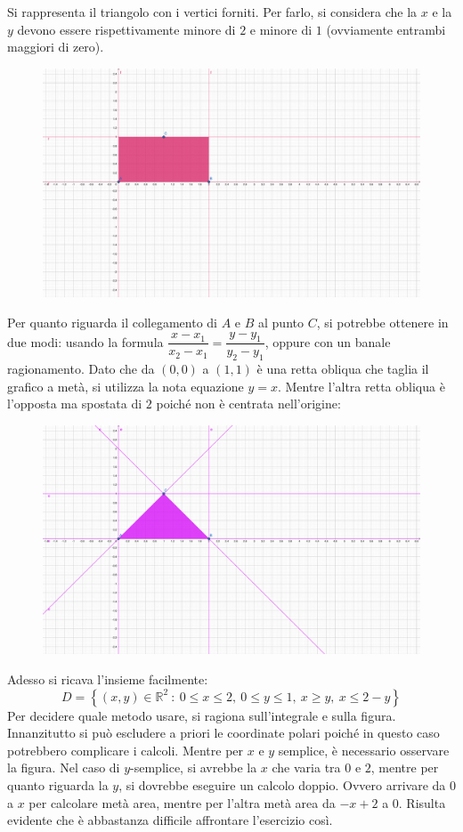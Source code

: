 \documentclass[a4paper]{article}
\begin{document}
	\noindent
	Si rappresenta il triangolo con i vertici forniti. Per farlo, si considera che la $x$ e la $y$ devono essere rispettivamente minore di $2$ e minore di $1$ (ovviamente entrambi maggiori di zero). 
	\begin{figure}[!htp]
		\centering
		\includegraphics[width=.8\textwidth]{img/exercise/2023-07-10-A-ex6.pdf}
	\end{figure}
	
	\noindent
	Per quanto riguarda il collegamento di $A$ e $B$ al punto $C$, si potrebbe ottenere in due modi: usando la formula $\dfrac{x-x_{1}}{x_{2}-x_{1}} = \dfrac{y-y_{1}}{y_{2}-y_{1}}$, oppure con un banale ragionamento. Dato che da $\left(0,0\right)$ a $\left(1,1\right)$ è una retta obliqua che taglia il grafico a metà, si utilizza la nota equazione $y = x$. Mentre l'altra retta obliqua è l'opposta ma spostata di $2$ poiché non è centrata nell'origine:
	\begin{figure}[!htp]
		\centering
		\includegraphics[width=.8\textwidth]{img/exercise/2023-07-10-A-ex6_2.pdf}
	\end{figure}\newpage

	\noindent
	Adesso si ricava l'insieme facilmente:
	\begin{equation*}
		D = \left\{\left(x,y\right) \in \mathbb{R}^{2} \: : \: 0 \le x \le 2, \: 0 \le y \le 1, \: x \ge y, \: x \le 2-y\right\}
	\end{equation*}
	Per decidere quale metodo usare, si ragiona sull'integrale e sulla figura. Innanzitutto si può escludere a priori le coordinate polari poiché in questo caso potrebbero complicare i calcoli. Mentre per $x$ e $y$ semplice, è necessario osservare la figura. Nel caso di $y$-semplice, si avrebbe la $x$ che varia tra $0$ e $2$, mentre per quanto riguarda la $y$, si dovrebbe eseguire un calcolo doppio. Ovvero arrivare da $0$ a $x$ per calcolare metà area, mentre per l'altra metà area da $-x+2$ a $0$. Risulta evidente che è abbastanza difficile affrontare l'esercizio così.
\end{document}
